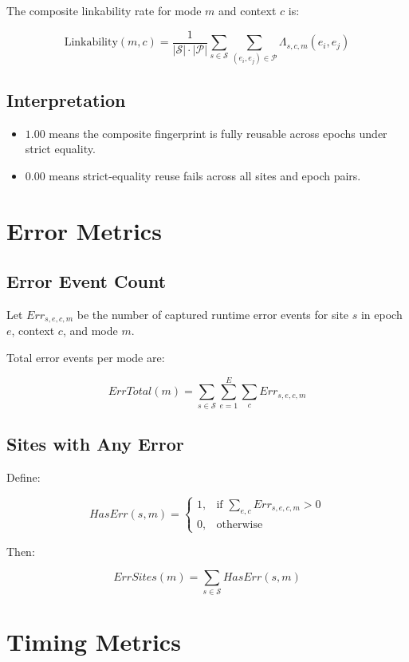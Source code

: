 \documentclass[11pt]{report}
\begin{document}
The composite linkability rate for mode $m$ and context $c$ is:

\[
\text{Linkability}(m,c) =
\frac{1}{|\mathcal{S}| \cdot |\mathcal{P}|}
\sum_{s \in \mathcal{S}} \sum_{(e_i,e_j)\in\mathcal{P}}
\Lambda_{s,c,m}(e_i,e_j)
\]

\subsection{Interpretation}

\begin{itemize}
    \item $1.00$ means the composite fingerprint is fully reusable across epochs under strict equality.
    \item $0.00$ means strict-equality reuse fails across all sites and epoch pairs.
\end{itemize}

\section{Error Metrics}

\subsection{Error Event Count}

Let $Err_{s,e,c,m}$ be the number of captured runtime error events for site $s$ in epoch $e$, context $c$, and mode $m$.

Total error events per mode are:

\[
ErrTotal(m) = \sum_{s\in\mathcal{S}} \sum_{e=1}^{E} \sum_{c}
Err_{s,e,c,m}
\]

\subsection{Sites with Any Error}

Define:

\[
HasErr(s,m) =
\begin{cases}
1, & \text{if } \sum_{e,c} Err_{s,e,c,m} > 0 \\
0, & \text{otherwise}
\end{cases}
\]

Then:

\[
ErrSites(m) = \sum_{s\in\mathcal{S}} HasErr(s,m)
\]

\section{Timing Metrics}
\end{document}
